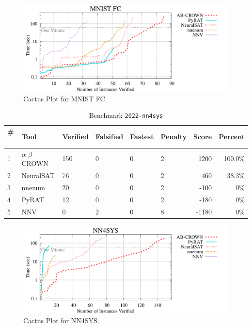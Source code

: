 \begin{figure}[h]
\centerline{\includegraphics[width=\textwidth]{cactus/2022_mnist_fc.pdf}}
\caption{Cactus Plot for MNIST FC.}
\label{fig:quantPic}
\end{figure}



\begin{table}[h]
\begin{center}
\caption{Benchmark \texttt{2022-nn4sys}} \label{tab:cat_{cat}}
{\setlength{\tabcolsep}{2pt}
\begin{tabular}[h]{@{}llllllrr@{}}
\toprule
\textbf{\# ~} & \textbf{Tool} & \textbf{Verified} & \textbf{Falsified} & \textbf{Fastest} & \textbf{Penalty} & \textbf{Score} & \textbf{Percent}\\
\midrule
1 & $\alpha$-$\beta$-CROWN & 150 & 0 & 0 & 2 & 1200 & 100.0\% \\
2 & NeuralSAT & 76 & 0 & 0 & 2 & 460 & 38.3\% \\
3 & nnenum & 20 & 0 & 0 & 2 & -100 & 0\% \\
4 & PyRAT & 12 & 0 & 0 & 2 & -180 & 0\% \\
5 & NNV & 0 & 2 & 0 & 8 & -1180 & 0\% \\
\bottomrule
\end{tabular}
}
\end{center}
\end{table}



\begin{figure}[h]
\centerline{\includegraphics[width=\textwidth]{cactus/2022_nn4sys.pdf}}
\caption{Cactus Plot for NN4SYS.}
\label{fig:quantPic}
\end{figure}


